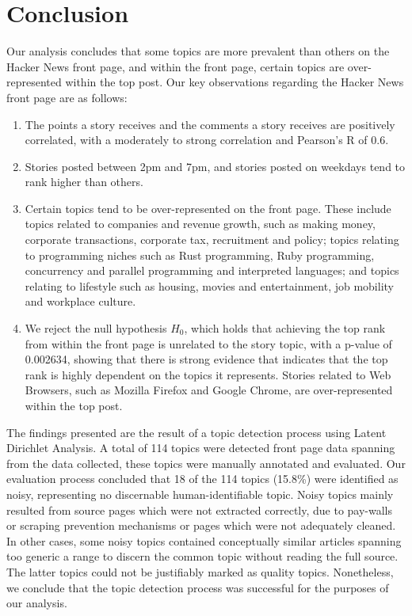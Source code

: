 \documentclass[11pt,journal,final,a4paper]{IEEEtran}
\begin{document}
\section{Conclusion}

Our analysis concludes that some topics are more prevalent than others on the Hacker News front page, and within the front page, certain topics are over-represented within the top post. Our key observations regarding the Hacker News front page are as follows:
\begin{enumerate}
\item The points a story receives and the comments a story receives are positively correlated, with a moderately to strong correlation and Pearson's R of 0.6.
\item Stories posted between 2pm and 7pm, and stories posted on weekdays tend to rank higher than others.
\item Certain topics tend to be over-represented on the front page. These include topics related to companies and revenue growth, such as making money, corporate transactions, corporate tax, recruitment and policy; topics relating to programming niches such as Rust programming, Ruby programming, concurrency and parallel programming and interpreted languages; and topics relating to lifestyle such as housing, movies and entertainment, job mobility and workplace culture. 
\item We reject the null hypothesis $H_{0}$, which holds that achieving the top rank from within the front page is unrelated to the story topic, with a p-value of 0.002634, showing that there is strong evidence that indicates that the top rank is highly dependent on the topics it represents. Stories related to Web Browsers, such as Mozilla Firefox and Google Chrome, are over-represented within the top post.
\end{enumerate}

The findings presented are the result of a topic detection process using Latent Dirichlet Analysis. A total of 114 topics were detected front page data spanning from the data collected, these topics were manually annotated and evaluated. Our evaluation process concluded that 18 of the 114 topics (15.8\%) were identified as noisy, representing no discernable human-identifiable topic. Noisy topics mainly resulted from source pages which were not extracted correctly, due to pay-walls or scraping prevention mechanisms or pages which were not adequately cleaned. In other cases, some noisy topics contained conceptually similar articles spanning too generic a range to discern the common topic without reading the full source. The latter topics could not be justifiably marked as quality topics. Nonetheless, we conclude that the topic detection process was successful for the purposes of our analysis.
\end{document}

